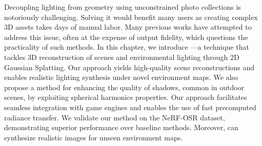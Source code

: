 Decoupling lighting from geometry using unconstrained photo collections is
notoriously challenging.
Solving it would benefit many users as creating complex 3D assets takes days
of manual labor.
Many previous works have attempted to address this issue, often at the expense
of output fidelity, which questions the practicality of such methods.
In this chapter, we introduce \lumigauss---a technique that tackles 3D
reconstruction of scenes and environmental lighting through 2D Gaussian
Splatting.
Our approach yields high-quality scene reconstructions and enables realistic
lighting synthesis under novel environment maps.
We also propose a method for enhancing the quality of shadows, common in
outdoor scenes, by exploiting spherical harmonics properties.
Our approach facilitates seamless integration with game engines and enables
the use of fast precomputed radiance transfer.
We validate our method on the NeRF-OSR dataset, demonstrating superior
performance over baseline methods.
Moreover, \lumigauss can synthesize realistic images for unseen environment
maps.
